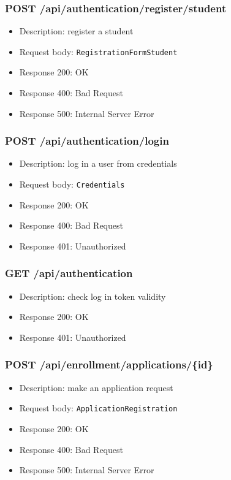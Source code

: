 \subsubsection{POST /api/authentication/register/student}
\begin{itemize}
    \item Description: register a student
    \item Request body: \verb|RegistrationFormStudent|
    \item Response 200: OK
    \item Response 400: Bad Request
    \item Response 500: Internal Server Error
\end{itemize}

\subsubsection{POST /api/authentication/login}
\begin{itemize}
    \item Description: log in a user from credentials
    \item Request body: \verb|Credentials|
    \item Response 200: OK
    \item Response 400: Bad Request
    \item Response 401: Unauthorized
\end{itemize}

\subsubsection{GET /api/authentication}
\begin{itemize}
    \item Description: check log in token validity
    \item Response 200: OK
    \item Response 401: Unauthorized
\end{itemize}

\subsubsection{POST /api/enrollment/applications/\{id\}}
\begin{itemize}
    \item Description: make an application request
    \item Request body: \verb|ApplicationRegistration|
    \item Response 200: OK
    \item Response 400: Bad Request
    \item Response 500: Internal Server Error
\end{itemize}

